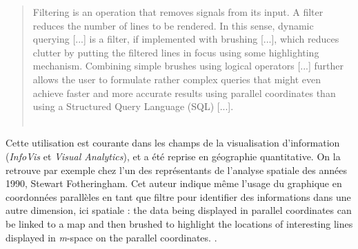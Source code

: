 \begin{quotation}\vspace{-0.5cm}
	\og Filtering is an operation that removes signals from its input. A filter reduces the number of lines to be rendered. In this sense, dynamic querying [...] is a filter, if implemented with brushing [...], which reduces clutter by putting the filtered lines in focus using some highlighting mechanism. Combining simple brushes using logical operators [...] further allows the user to formulate rather complex queries that might even achieve faster and more accurate results using parallel coordinates than using a Structured Query Language (SQL) [...].\fg{}\\
	\mbox{}~ \hfill \cite[p. 13]{heinrich_state_2013}
\end{quotation}


Cette utilisation est courante dans les champs de la visualisation d'information (\textit{InfoVis} et \textit{Visual Analytics}), et a été reprise en géographie quantitative.
On la retrouve par exemple chez l'un des représentants de l'analyse spatiale des années 1990, Stewart Fotheringham.
Cet auteur indique même l'usage du graphique en coordonnées parallèles en tant que filtre pour identifier des informations dans une autre dimension, ici spatiale : \og the data being displayed in parallel coordinates can be linked to a map and then brushed to highlight the locations of interesting lines displayed in \textit{m}-space on the parallel coordinates.\fg{} \autocite{fotheringham_trends_1999}.

